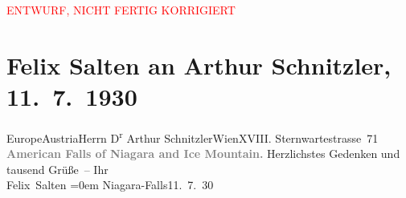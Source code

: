 
\begin{center}
            \textcolor{red}{ENTWURF, NICHT FERTIG KORRIGIERT}
                      \end{center}
            
         
         \renewcommand{\erwaehntePersonen}{Personen: Felix Salten}
         \renewcommand{\erwaehnteOrte}{Orte: Buffalo, Europa, Niagara Falls, Wien, Österreich}
         \renewcommand{\erwaehnteWerke}{}
               \section[Felix Salten an Arthur Schnitzler, 11. 7. 1930]{ Felix Salten an Arthur Schnitzler, 11. 7. 1930}\nopagebreak{}\rehead{ }\begin{ledgroupsized}[t]{13cm}\normalsize\beginnumbering \toendnotes[C]{\smallbreak\pagebreak[2]} 
\pstart{}{\pb}Europe\pend{}\pstart{}Austria\pend{}\pstart{}Herrn D\textsuperscript{r} Arthur Schnitzler\pend{}\pstart{}Wien\pend{}\pstart{}XVIII. Sternwartestrasse 71\pend{}{\bigskip}\pstart
           \noindent{}\centering{}{\pb}\textcolor{gray}{\textbf{American Falls of Niagara and Ice
                     Mountain.}}\pend
           \pstart
           {\pb}Herzlichstes Gedenken und tausend Grüße –\pend
           \pstart
           Ihr {\\[\baselineskip]}\spacefill\mbox{Felix Salten}\pend
           \leftskip=0em{}\pstart
           Niagara-Falls11. 7. 30\pend
           
         
         \endnumbering{}\end{ledgroupsized}\begin{anhang}\end{anhang}\newcommand{\dateiname}{L03593}\newcommand{\titel}{Felix Salten an Arthur Schnitzler, 11. 7. 1930}\newcommand{\editorInnen}{Martin Anton Müller und Laura Untner}
      